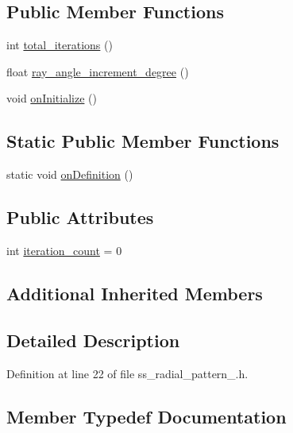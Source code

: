 \subsection*{Public Member Functions}
\begin{DoxyCompactItemize}
\item 
int \hyperlink{structsm__dance__bot__2_1_1SS1_1_1SsRadialPattern1_a14abf04c65ee07d9f4bdc354ed5a23fd}{total\+\_\+iterations} ()
\item 
float \hyperlink{structsm__dance__bot__2_1_1SS1_1_1SsRadialPattern1_aa3c4def707a1731ae0c0527c97c1a3e1}{ray\+\_\+angle\+\_\+increment\+\_\+degree} ()
\item 
void \hyperlink{structsm__dance__bot__2_1_1SS1_1_1SsRadialPattern1_a4715089da2c09337a4aa4274bdbbe007}{on\+Initialize} ()
\end{DoxyCompactItemize}
\subsection*{Static Public Member Functions}
\begin{DoxyCompactItemize}
\item 
static void \hyperlink{structsm__dance__bot__2_1_1SS1_1_1SsRadialPattern1_a4d59aa72c347a614431272dcbb2cb786}{on\+Definition} ()
\end{DoxyCompactItemize}
\subsection*{Public Attributes}
\begin{DoxyCompactItemize}
\item 
int \hyperlink{structsm__dance__bot__2_1_1SS1_1_1SsRadialPattern1_a271a1f904960fed7e6a3fc8856ed0ed2}{iteration\+\_\+count} = 0
\end{DoxyCompactItemize}
\subsection*{Additional Inherited Members}


\subsection{Detailed Description}


Definition at line 22 of file ss\+\_\+radial\+\_\+pattern\+\_.\+h.



\subsection{Member Typedef Documentation}
